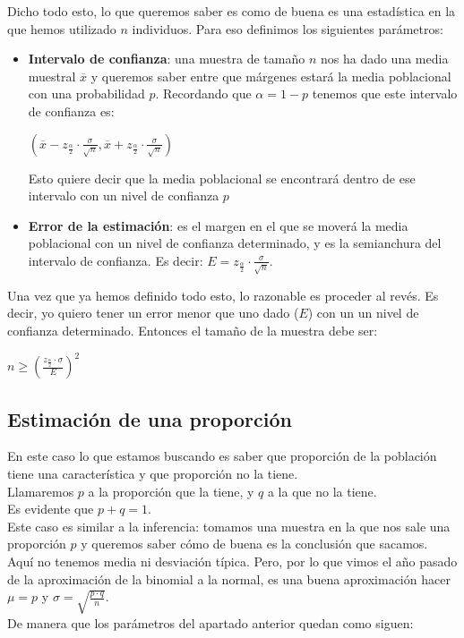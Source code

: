 \documentclass[a4paper,10pt,answers]{exam}
\begin{document}
Dicho todo esto, lo que queremos saber es como de buena es una estadística en la que hemos utilizado $n$ individuos. Para eso definimos los siguientes parámetros:
\begin{itemize}
	\item \textbf{Intervalo de confianza}: una muestra de tamaño $n$ nos ha dado una media muestral $\overline{x}$ y 
	queremos saber entre
	que márgenes estará la media poblacional con una probabilidad $p$. Recordando que $\alpha = 1 - p$ tenemos que este
	intervalo de confianza es:
	\begin{center}
		$\left(\overline{x} - z_{\frac{\alpha}{2}} \cdot \frac{\sigma}{\sqrt{n}}, \overline{x} + z_{\frac{\alpha}{2}} \cdot \frac{\sigma}{\sqrt{n}}\right)$
	\end{center}
	Esto quiere decir que la media poblacional se encontrará dentro de ese intervalo con un nivel de confianza $p$
	\item \textbf{Error de la estimación}: es el margen en el que se moverá la media poblacional con un nivel de confianza determinado, y es la semianchura del intervalo de confianza. Es decir: $E = z_{\frac{\alpha}{2}} \cdot \frac{\sigma}{\sqrt{n}}$.
\end{itemize}
Una vez que ya hemos definido todo esto, lo razonable es proceder al revés. Es decir, yo quiero tener un error menor que uno dado ($E$) con un un nivel de confianza determinado. Entonces el tamaño de la muestra debe ser:
\begin{center}
$n \geq \left(\frac{z_{\frac{\alpha}{2}} \cdot \sigma}{E} \right)^2$
\end{center}

\subsection*{Estimación de una proporción}
En este caso lo que estamos buscando es saber que proporción de la población tiene una característica y que proporción no la tiene.\\
Llamaremos $p$ a la proporción que la tiene, y $q$ a la que no la tiene.\\
Es evidente que $p + q = 1$.\\

Este caso es similar a la inferencia: tomamos una muestra en la que nos sale una proporción $p$ y queremos saber cómo de buena es la conclusión que sacamos.\\

Aquí no tenemos media ni desviación típica. Pero, por lo que vimos el año pasado de la aproximación de la binomial a la normal, es una buena aproximación hacer $\mu = p$ y $\sigma = \sqrt{\frac{p \cdot q}{n}}$.\\
De manera que los parámetros del apartado anterior quedan como siguen:
\end{document}
